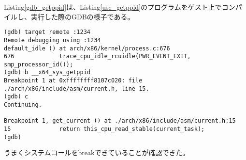 \documentclass[main]{subfiles}
\begin{document}
Listing\ref{gdb_getppid}は、Listing\ref{use_getppid}のプログラムをゲスト上でコンパイルし、実行した際のGDBの様子である。

\begin{lstlisting}[label=gdb_getppid,caption=GDBの動作の様子]
(gdb) target remote :1234
Remote debugging using :1234
default_idle () at arch/x86/kernel/process.c:676
676             trace_cpu_idle_rcuidle(PWR_EVENT_EXIT, smp_processor_id());
(gdb) b __x64_sys_getppid
Breakpoint 1 at 0xffffffff8107c020: file ./arch/x86/include/asm/current.h, line 15.
(gdb) c
Continuing.

Breakpoint 1, get_current () at ./arch/x86/include/asm/current.h:15
15              return this_cpu_read_stable(current_task);
(gdb)
\end{lstlisting}

うまくシステムコールをbreakできていることが確認できた。
\end{document}
